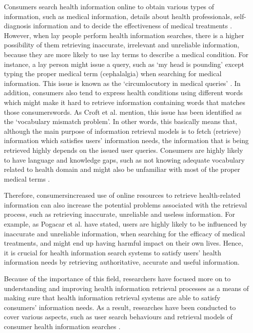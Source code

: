 \documentclass[]{article}
\begin{document}
Consumers search health information online to obtain various types of information, such as medical information, details about health professionals, self-diagnosis information and to decide the effectiveness of medical treatments 
\cite{pogacar2017positive}. However, when lay people perform health information searches, there is a higher possibility of them retrieving inaccurate, irrelevant and unreliable information, because they are more likely to use lay terms to describe a medical condition. For instance, a lay person might issue a query, such as ‘my head is pounding’ except typing the proper medical term (cephalalgia) when searching for medical information. This issue is known as the ‘circumlocutory in medical queries’ \cite{stanton2014circumlocution}. In addition, consumers also tend to express health conditions using different words which might make it hard to retrieve information containing words that matches those consumers\textquotesingle  words. As Croft et al. \cite{croft2010search} mention, this issue has been identified as the ‘vocabulary mismatch problem’. In other words, this basically means that, although the main purpose of information retrieval models is to fetch (retrieve) information which satisfies users’ information needs, the information that is being retrieved highly depends on the issued user queries. Consumers are highly likely to have language and knowledge gaps, such as not knowing adequate vocabulary related to health domain and might also be unfamiliar with most of the proper medical terms \cite{soldaini2016enhancing}. 
	
Therefore, consumers\textquotesingle  increased use of online resources to retrieve health-related information can also increase the potential problems associated with the retrieval process, such as retrieving inaccurate, unreliable and useless information. For example, as Pogacar et al. \cite{pogacar2017positive} have stated, users are highly likely to be influenced by inaccurate and unreliable information, when searching for the efficacy of medical treatments, and might end up having harmful impact on their own lives. Hence, it is crucial for health information search systems to satisfy users’ health information needs by retrieving authoritative, accurate and useful information.  
	
Because of the importance of this field, researchers have focused more on to understanding and improving health information retrieval processes as a means of making sure that health information retrieval systems are able to satisfy consumers\textquotesingle’ information needs. As a result, researches have been conducted to cover various aspects, such as user search behaviours and retrieval models of consumer health information searches \cite{toms2007consumers,zuccon2018choices}.    
	
\end{document}
